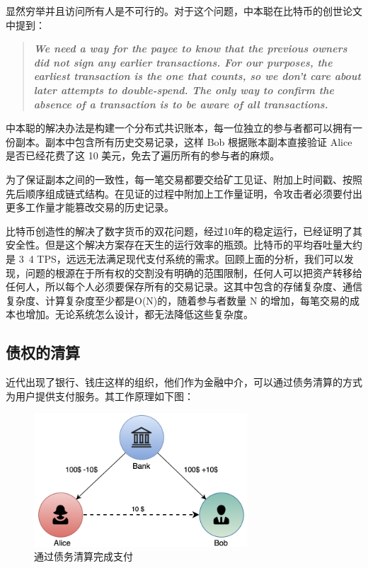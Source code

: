 显然穷举并且访问所有人是不可行的。对于这个问题，中本聪在比特币的创世论文中提到：

\begin{quote}
    \textbf{\textit{We need a way for the payee to know that the previous owners did not sign any earlier transactions. For our purposes, the earliest transaction is the one that counts, so we don't care about later attempts to double-spend. The only way to confirm the absence of a transaction is to be aware of all transactions.}}
\end{quote}

中本聪的解决办法是构建一个分布式共识账本，每一位独立的参与者都可以拥有一份副本。副本中包含所有历史交易记录，这样 Bob 根据账本副本直接验证 Alice 是否已经花费了这 10 美元，免去了遍历所有的参与者的麻烦。

为了保证副本之间的一致性，每一笔交易都要交给矿工见证、附加上时间戳、按照先后顺序组成链式结构。在见证的过程中附加上工作量证明，令攻击者必须要付出更多工作量才能篡改交易的历史记录。


比特币创造性的解决了数字货币的双花问题，经过10年的稳定运行，已经证明了其安全性。但是这个解决方案存在天生的运行效率的瓶颈。比特币的平均吞吐量大约是 3~4 TPS，远远无法满足现代支付系统的需求。回顾上面的分析，我们可以发现，问题的根源在于所有权的交割没有明确的范围限制，任何人可以把资产转移给任何人，所以每个人必须要保存所有的交易记录。这其中包含的存储复杂度、通信复杂度、计算复杂度至少都是O(N)的，随着参与者数量 N 的增加，每笔交易的成本也增加。无论系统怎么设计，都无法降低这些复杂度。

\subsection{债权的清算}

近代出现了银行、钱庄这样的组织，他们作为金融中介，可以通过债务清算的方式为用户提供支付服务。其工作原理如下图：

\begin{figure}[h!]
    \centering
    \includegraphics[width=8cm, keepaspectratio]{../images/clearing.png}
    \caption{通过债务清算完成支付}
    \label{fig:clearing}
\end{figure}

